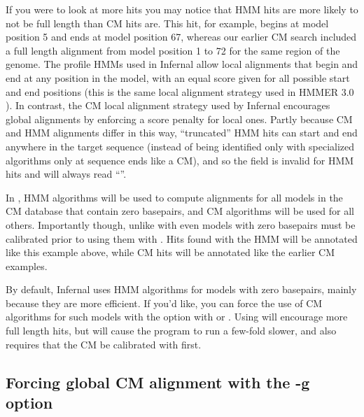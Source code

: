 If you were to look at more hits you may notice that HMM hits are
more likely to not be full length than CM hits are. This hit, for
example, begins at model position 5 and ends at model position 67,
whereas our earlier CM search included a full length alignment from
model position 1 to 72 for the same region of the genome. The profile
HMMs used in Infernal allow local alignments that begin and end at any
position in the model, with an equal score given for all possible
start and end positions (this is the same local alignment strategy
used in HMMER 3.0 \citep{Eddy08}). In contrast, the CM local alignment
strategy used by Infernal encourages global alignments by enforcing a
score penalty for local ones. Partly because CM and HMM alignments
differ in this way, ``truncated'' HMM hits can start and end anywhere
in the target sequence (instead of being identified only with
specialized algorithms only at sequence ends like a CM), and so the
 field is invalid for HMM hits and will always read
``\otext{-}''.

In , HMM algorithms will be used to compute alignments
for all models in the CM database that contain zero basepairs, and CM
algorithms will be used for all others. Importantly though, unlike with
 even models with zero basepairs must be calibrated
prior to using them with . Hits found with the HMM will
be annotated like this example above, while CM hits will be annotated
like the earlier CM examples.

By default, Infernal uses HMM algorithms for models with zero
basepairs, mainly because they are more efficient. If you'd like, you
can force the use of CM algorithms for such models with the
 option with  or . Using
 will encourage more full length hits, but will
cause the program to run a few-fold slower, and also requires that the
CM be calibrated with  first.

\subsection{Forcing global CM alignment with the -g option}

